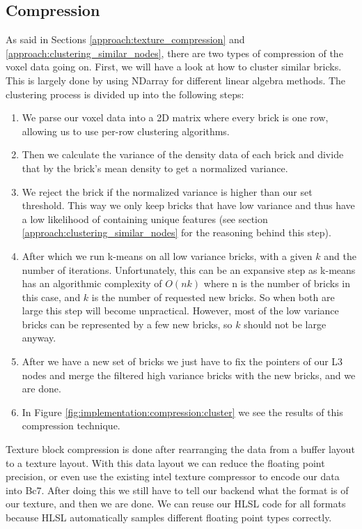 \subsection{Compression} \label{implementation:compression}
As said in Sections \ref{approach:texture_compression} and \ref{approach:clustering_similar_nodes}, there are two types of compression of the voxel data going on. First, we will have a look at how to cluster similar bricks. This is largely done by using NDarray \cite{NDarray} for different linear algebra methods. The clustering process is divided up into the following steps:

\begin{enumerate}
    \itemsep0em 
    \item We parse our voxel data into a 2D matrix where every brick is one row, allowing us to use per-row clustering algorithms.
    \item Then we calculate the variance of the density data of each brick and divide that by the brick's mean density to get a normalized variance.
    \item We reject the brick if the normalized variance is higher than our set threshold. This way we only keep bricks that have low variance and thus have a low likelihood of containing unique features (see section \ref{approach:clustering_similar_nodes} for the reasoning behind this step).
    \item After which we run k-means on all low variance bricks, with a given $k$ and the number of iterations. Unfortunately, this can be an expansive step as k-means has an algorithmic complexity of $O(nk)$ where n is the number of bricks in this case, and $k$ is the number of requested new bricks. So when both are large this step will become unpractical. However, most of the low variance bricks can be represented by a few new bricks, so $k$ should not be large anyway.
    \item After we have a new set of bricks we just have to fix the pointers of our L3 nodes and merge the filtered high variance bricks with the new bricks, and we are done.
    \item In Figure \ref{fig:implementation:compression:cluster} we see the results of this compression technique.
\end{enumerate}


\noindent Texture block compression is done after rearranging the data from a buffer layout to a texture layout. With this data layout we can reduce the floating point precision, or even use the existing intel texture compressor \cite{ISPCTextureCompressor} to encode our data into Bc7. After doing this we still have to tell our backend what the format is of our texture, and then we are done. We can reuse our HLSL code for all formats because HLSL automatically samples different floating point types correctly.




